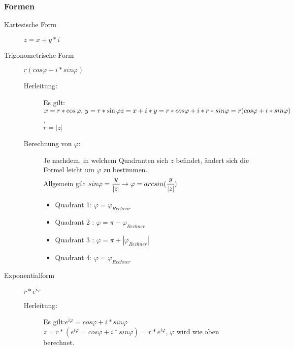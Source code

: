 \documentclass[a4paper]{scrartcl}
\begin{document}
            \subsubsection{Formen}    
                \begin{description}
                    \item[Kartesische Form] $z = x + y*i$
                    \item[Trigonometrische Form]   $r(cos\varphi + i*sin\varphi)$
                    \begin{description}
                        \item[Herleitung:]  Es gilt: \(x = r * \cos\varphi, \, y = r * \sin\varphi \\
                        z = x + i*y = r * cos\varphi + i * r* sin\varphi = r(cos\varphi + i*sin\varphi) \), 
                        \\ $r = |z|$ 
                        \item[Berechnung von $\varphi$:] Je nachdem, in welchem Quadranten sich $z$ befindet, ändert sich die Formel leicht um $\varphi$ zu bestimmen.\\
                            Allgemein gilt $sin \varphi = \cfrac{y}{|z|} \rightarrow \varphi = arcsin(\cfrac{y}{|z|})$
                        \begin{itemize}
                            \item Quadrant 1: $\varphi = \varphi_{Rechenr}$
                            \item Quadrant 2 : $\varphi = \pi - \varphi_{Rechner}$
                            \item Quadrant 3 : $\varphi = \pi + |\varphi_{Rechner}|$
                            \item Quadrant 4: $\varphi = \varphi_{Rechner}$
                        \end{itemize}
                    \end{description}
                    \newpage
                    \item[Exponentialform] $r * e^{i\varphi}$ 
                    \begin{description}
                        \item[Herleitung:] Es gilt:\(e^{i\varphi} = cos\varphi + i * sin\varphi \) \\ \(z = r * (e^{i\varphi} = cos\varphi + i * sin\varphi) = r * e^{i\varphi} \), $\varphi$ wird wie oben berechnet.
                    \end{description}
                \end{description}          
\end{document}
